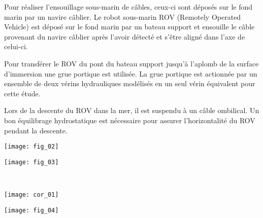 \ifprof
\vspace{1cm}
\else
\begin{multicols}{2}
\fi

\setcounter{numques}{0}

\ifprof
\else
Pour réaliser l’ensouillage sous-marin de câbles, ceux-ci sont déposés sur le fond marin par un navire câblier. Le robot sous-marin ROV (Remotely Operated Vehicle) est déposé sur le fond marin par un bateau support et ensouille le câble provenant
du navire câblier après l’avoir détecté et s’être aligné dans l’axe de celui-ci.

Pour transférer le ROV du pont du bateau support jusqu’à l’aplomb de la surface d’immersion une grue portique est utilisée. 
La grue portique est actionnée par un ensemble de deux vérins hydrauliques modélisés en un seul vérin équivalent pour cette étude.

Lors de la descente du ROV dans la mer, il est suspendu à un câble ombilical. Un bon équilibrage hydrostatique est
nécessaire pour assurer l’horizontalité du ROV pendant la descente.


\begin{center}
\texttt{[image: fig\_02]}
\end{center}

\begin{center}
\texttt{[image: fig\_03]}
\end{center}
\fi

\ifprof
\begin{corrige}~\\

\begin{center}
\texttt{[image: cor\_01]}
\end{center}
\end{corrige}

\else
\end{multicols}
\fi

\ifprof
\else
\begin{center}
\texttt{[image: fig\_04]}
\end{center}
\fi
